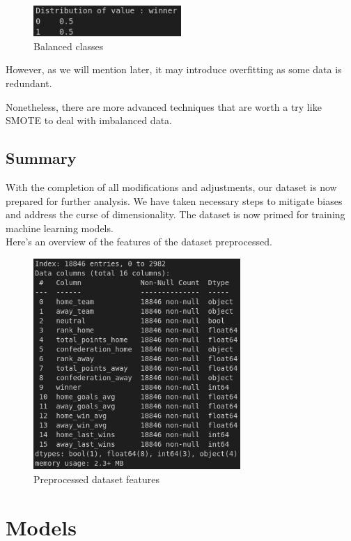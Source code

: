 \documentclass[a4paper,12pt]{article}
\begin{document}
\begin{figure}[H]
  \centering
  \includegraphics[width=0.5\textwidth]{./images/balanced.png}
  \caption{Balanced classes}
  \label{fig:balanced}
\end{figure}

However, as we will mention later, it may introduce overfitting as some data is redundant.

Nonetheless, there are more advanced techniques that are worth a try like SMOTE to deal with imbalanced data.
\subsection{Summary}

With the completion of all modifications and adjustments, our dataset is now prepared for further analysis. We have taken necessary steps to mitigate biases and address the curse of dimensionality. The dataset is now primed for training machine learning models.\\

Here's an overview of the features of the dataset preprocessed.

\begin{figure}[H]
  \centering
  \includegraphics[width=0.7\textwidth]{./images/df_info.png}
  \caption{Preprocessed dataset features}
  \label{fig:dataset_features}
\end{figure}

\section{Models}
\end{document}
